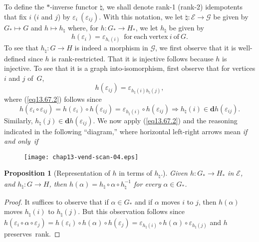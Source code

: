 \documentclass{surv-l}
\numberwithin{equation}{section}
\numberwithin{table}{section}
\numberwithin{figure}{section}
\newtheorem{proposition}[equation]{Proposition}
\theoremstyle{definition}
\begin{document}
To define the $*$-inverse functor ${\natural}$, we shall
denote rank-1 (rank-2) idempotents that fix $i$ ($i$ and $j$)
by $\varepsilon_{i}\ (\varepsilon_{ij})$. With this notation, we
let $\natural : \mathcal{E}\rightarrow \mathcal{G}$ be
given by $G_{\ast}\mapsto G$ and $h\mapsto h_{\natural}$
where, for $h:G_{\ast}\rightarrow H_{\ast}$, we let
$h_{\natural}$ be given by
\begin{equation}\label{eq13.67.1}
h(\varepsilon_{i})=\varepsilon_{h_{^{\natural}}(i)}\enspace
\mathrm{for\ each\ vertex}\ i\ \mathrm{of}\ G.
\end{equation}
To see that $h_{\natural} : G\rightarrow H$ is indeed a
morphism in $\mathcal{G}$, we first observe that it is
well-defined since $h$ is rank-restricted. That it is
injective follows because $h$ is injective. To see that it is
a graph into-isomorphism, first observe that for vertices $i$
and $j$ of~$G$,
\begin{equation}\label{eq13.67.2}
h(\varepsilon_{ij})=\varepsilon_{h_{\natural}(i)h_{\natural}(j)},
\end{equation}
where (\ref{eq13.67.2}) follows since
\[
h(\varepsilon_{i}\circ\varepsilon_{ij})=h(\varepsilon_{i})\circ h(\varepsilon_{ij})
=\varepsilon_{h_{\natural}(i)}\circ h(\varepsilon_{ij})\Rightarrow
h_{\natural}(i)\in \mathbf{d}h(\varepsilon_{ij}).
\]
Similarly, $ h_{\natural}(j)\in
\textbf{d}h(\varepsilon_{ij})$. We now apply (\ref{eq13.67.2}) and
the reasoning indicated in the following ``diagram,'' where
horizontal left-right arrows mean \emph{if and only~if}
\begin{figure}[!h]
\texttt{[image: chap13-vend-scan-04.eps]}
\end{figure}

\begin{proposition}[Representation of $h$ in terms
of $h_{\natural}.$]\label{prop13.67.3} Given
 $h:G_{\ast}\rightarrow H_{\ast}$ in $\mathcal{E}$, and
$h_{\natural} : G\rightarrow H$, then
$h(\alpha)=h_{\natural}\circ \alpha \circ
h_{\natural}^{-1}$ for every $\alpha\in G_{\ast}$.
\end{proposition}

\begin{proof}It suffices to observe that if $\alpha\in G_{\ast}$ and if
$\alpha$ moves $i$ to $j$, then $h(\alpha)$ moves
$h_{\natural}(i)$ to $h_{\natural}(j)$. But this
observation follows since
$h(\varepsilon_{i}\circ\alpha\circ\varepsilon_{j})=
h(\varepsilon_{i})\circ h(\alpha)\circ
h(\varepsilon_{j})=\varepsilon_{h_{\natural}(i)}\circ
h(\alpha)\circ\varepsilon_{h_{\natural}(j)}$ and $h$
preserves~rank.
\end{proof}
\end{document}
